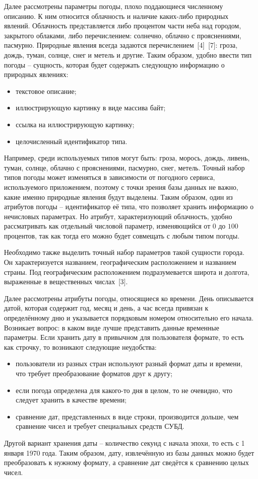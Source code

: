 Далее рассмотрены параметры погоды, плохо поддающиеся численному описанию.
К ним относится облачность и наличие каких-либо природных явлений.
Облачность представляется либо процентом части неба над городом, закрытого облаками, либо перечислением: солнечно, облачно с прояснениями, пасмурно.
Природные явления всегда задаются перечислением~[4]~[7]: гроза, дождь, туман, солнце, снег и метель и другие.
Таким образом, удобно ввести тип погоды -- сущность, которая будет содержать следующую информацию о природных явлениях:
\begin{itemize}
    \item текстовое описание;
    \item иллюстрирующую картинку в виде массива байт;
    \item ссылка на иллюстрирующую картинку;
    \item целочисленный идентификатор типа.
\end{itemize}
Например, среди используемых типов могут быть: гроза, морось, дождь, ливень, туман, солнце, облачно с прояснениями, пасмурно, снег, метель.
Точный набор типов погоды может изменяться в зависимости от погодного сервиса, используемого приложением, поэтому с точки зрения базы данных не важно, какие именно природные явления будут выделены.
Таким образом, один из атрибутов погоды -- идентификатор её типа, что позволяет хранить информацию о нечисловых параметрах.
Но атрибут, характеризующий облачность, удобно рассматривать как отдельный числовой параметр, изменяющийся от $0$ до $100$ процентов, так как тогда его можно будет совмещать с любым типом погоды.

Необходимо также выделить точный набор параметров такой сущности города.
Он характеризуется названием, географическим расположением и названием страны.
Под географическим расположением подразумевается широта и долгота, выраженные в вещественных числах~[3].

Далее рассмотрены атрибуты погоды, относящиеся ко времени.
День описывается датой, которая содержит год, месяц и день, а час всегда привязан к определённому дню и указывается порядковым номером относительно его начала.
Возникает вопрос: в каком виде лучше представить данные временные параметры.
Если хранить дату в привычном для пользователя формате, то есть как строчку, то возникают следующие неудобства:
\begin{itemize}
    \item
        пользователи из разных стран используют разный формат даты и времени, что требует преобразование форматов друг к другу;
    \item
        если погода определена для какого-то дня в целом, то не очевидно, что следует хранить в качестве времени;
    \item
        сравнение дат, представленных в виде строки, производится дольше, чем сравнение чисел и требует специальных средств СУБД.
\end{itemize}
Другой вариант хранения даты -- количество секунд с начала эпохи, то есть с 1 января 1970 года.
Таким образом, дату, извлечённую из базы данных можно будет преобразовать к нужному формату, а сравнение дат сведётся к сравнению целых чисел.

